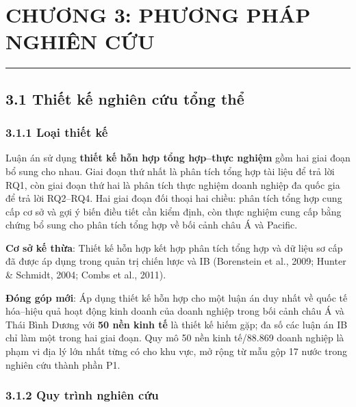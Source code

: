 \documentclass[
  a4paper,
  13pt]{extreport}
\author{}
\date{}
\begin{document}
\hypertarget{chux1b0ux1a1ng-3-phux1b0ux1a1ng-phuxe1p-nghiuxean-cux1ee9u}{%
\chapter{CHƯƠNG 3: PHƯƠNG PHÁP NGHIÊN
CỨU}\label{chux1b0ux1a1ng-3-phux1b0ux1a1ng-phuxe1p-nghiuxean-cux1ee9u}}

\begin{center}\rule{0.5\linewidth}{0.5pt}\end{center}

\hypertarget{thiux1ebft-kux1ebf-nghiuxean-cux1ee9u-tux1ed5ng-thux1ec3}{%
\section{3.1 Thiết kế nghiên cứu tổng
thể}\label{thiux1ebft-kux1ebf-nghiuxean-cux1ee9u-tux1ed5ng-thux1ec3}}

\hypertarget{loux1ea1i-thiux1ebft-kux1ebf}{%
\subsection{3.1.1 Loại thiết kế}\label{loux1ea1i-thiux1ebft-kux1ebf}}

Luận án sử dụng \textbf{thiết kế hỗn hợp tổng hợp--thực nghiệm} gồm hai
giai đoạn bổ sung cho nhau. Giai đoạn thứ nhất là phân tích tổng hợp tài
liệu để trả lời RQ1, còn giai đoạn thứ hai là phân tích thực nghiệm
doanh nghiệp đa quốc gia để trả lời RQ2--RQ4. Hai giai đoạn đối thoại
hai chiều: phân tích tổng hợp cung cấp cơ sở và gợi ý biến điều tiết cần
kiểm định, còn thực nghiệm cung cấp bằng chứng bổ sung cho phân tích
tổng hợp về bối cảnh châu Á và Pacific.

\textbf{Cơ sở kế thừa}: Thiết kế hỗn hợp kết hợp phân tích tổng hợp và
dữ liệu sơ cấp đã được áp dụng trong quản trị chiến lược và IB
(Borenstein et al., 2009; Hunter \& Schmidt, 2004; Combs et al., 2011).

\textbf{Đóng góp mới}: Áp dụng thiết kế hỗn hợp cho một luận án duy nhất
về quốc tế hóa--hiệu quả hoạt động kinh doanh của doanh nghiệp trong bối
cảnh châu Á và Thái Bình Dương với \textbf{50 nền kinh tế} là thiết kế
hiếm gặp; đa số các luận án IB chỉ làm một trong hai giai đoạn. Quy mô
50 nền kinh tế/88.869 doanh nghiệp là phạm vi địa lý lớn nhất từng có
cho khu vực, mở rộng từ mẫu gộp 17 nước trong nghiên cứu thành phần P1.

\hypertarget{quy-truxecnh-nghiuxean-cux1ee9u}{%
\subsection{3.1.2 Quy trình nghiên
cứu}\label{quy-truxecnh-nghiuxean-cux1ee9u}}
\end{document}
